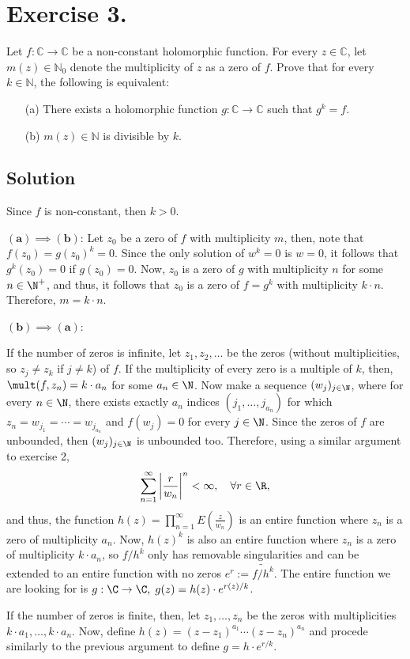 
\section{Exercise 3.}

Let \( f : \mathbb{C} \to \mathbb{C} \) be a non-constant holomorphic function. For every \( z \in \mathbb{C} \), let \( m(z) \in \mathbb{N}_0 \) denote the multiplicity of \( z \) as a zero of \( f \).  
Prove that for every \( k \in \mathbb{N} \), the following is equivalent:  
\begin{itemize}
    \item[(a)] There exists a holomorphic function \( g : \mathbb{C} \to \mathbb{C} \) such that \( g^k = f \).  
    \item[(b)] \( m(z) \in \mathbb{N} \) is divisible by \( k \).
\end{itemize}

\subsection*{Solution}

Since $f$ is non-constant, then $k > 0$.

$\boldsymbol{(a) \implies (b)}$: Let $z_0$ be a zero of $f$ with multiplicity $m$, then, note that $f(z_0) = g(z_0)^k = 0$. Since the only solution of $w^k = 0$ is $w = 0$, it follows that $g^k(z_0) = 0$ if $g(z_0) = 0$. Now, $z_0$ is a zero of $g$ with multiplicity $n$ for some $n\in \N^+$, and thus, it follows that $z_0$ is a zero of $f = g^k$ with multiplicity $k\cdot n$. Therefore, $m = k\cdot n$.

$\boldsymbol{(b) \implies (a)}$:

If the number of zeros is infinite, let $z_1,z_2,\ldots$ be the zeros (without multiplicities, so $z_j \neq z_k$ if $j\neq k$) of $f$. If the multiplicity of every zero is a multiple of $k$, then, $\mult(f,z_n) = k \cdot a_n$ for some $a_n \in \N$. Now make a sequence $(w_j)_{j\in\N}$, where for every $n\in \N$, there exists exactly $a_n$ indices $(j_{1},\ldots,j_{a_n})$ for which $z_n = w_{j_1} = \cdots = w_{j_{a_n}}$ and $f(w_j) = 0$ for every $j\in \N$. Since the zeros of $f$ are unbounded, then $(w_j)_{j\in\N}$ is unbounded too. Therefore, using a similar argument to exercise 2,
\[ \sum_{n = 1}^{\infty} \left| \frac{r}{w_n} \right|^n < \infty,\quad \forall r\in \R, \]
and thus, the function $h(z) = \prod_{n = 1}^{\infty} E\left( \frac{z}{w_n} \right)$ is an entire function where $z_n$ is a zero of multiplicity $a_n$. Now, $h(z)^k$ is also an entire function where $z_n$ is a zero of multiplicity $k\cdot a_n$, so $f/h^k$ only has removable singularities and can be extended to an entire function with no zeros $e^{r} := \widetilde{f/h^k} $. The entire function we are looking for is $g:\C \to \C,\; g(z) = h(z) \cdot e^{r(z)/k}$.

If the number of zeros is finite, then, let $z_1, \ldots, z_n$ be the zeros with multiplicities $k\cdot a_1, \ldots, k\cdot a_n$. Now, define $h(z) = (z-z_1)^{a_1} \cdots (z-z_n)^{a_n}$ and procede similarly to the previous argument to define $g = h \cdot e^{r/k}$.